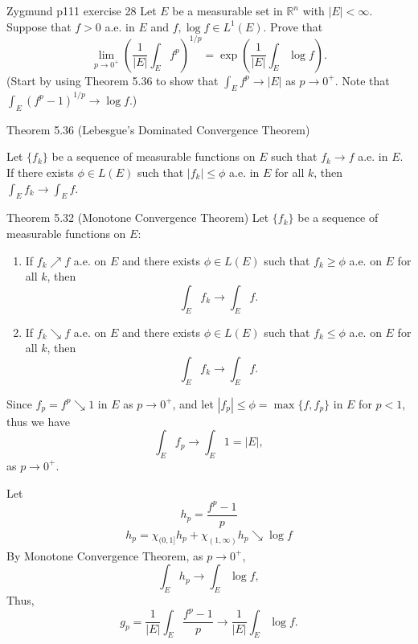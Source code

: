 \documentclass[UTF8,a4paper,10pt]{article}
\begin{document}
\begin{Problem}[]{Zygmund p111 exercise 28}
  Let $E$ be a measurable set in $\mathbb{R}^n$ with $|E| < \infty$. Suppose that $f > 0$ a.e. in $E$ and $f, \log f \in L^1(E)$. Prove that
\[
\lim_{{p \to 0^+}} \left( \frac{1}{|E|} \int_E f^p  \right)^{1/p} = \exp\left(\frac{1}{|E|} \int_E \log f \right).
\]
(Start by using Theorem 5.36 to show that $\int_E f^p  \to |E|$ as $p \to 0^+$. Note that $\int_E (f^p - 1)^{1/p}  \to \log f$.)

\end{Problem}


\begin{mybox}{Theorem 5.36 (Lebesgue's Dominated Convergence Theorem)}

  Let $\{f_k\}$ be a sequence of measurable functions on $E$ such that $f_k \to f$ a.e. in $E$. If there exists $\phi \in L(E)$ such that $|f_k| \leq \phi$ a.e. in $E$ for all $k$, then $\int_E f_k  \to \int_E f $.

\end{mybox}

\begin{mybox}{Theorem 5.32 (Monotone Convergence Theorem)}
   Let $\{f_k\}$ be a sequence of measurable functions on $E$:
  \begin{enumerate}
      \item If $f_k \nearrow f$ a.e. on $E$ and there exists $\phi \in L(E)$ such that $f_k \geq \phi$ a.e. on $E$ for all $k$, then 
      \[
          \int_E f_k  \to \int_E f .
      \]
      \item If $f_k \searrow f$ a.e. on $E$ and there exists $\phi \in L(E)$ such that $f_k \leq \phi$ a.e. on $E$ for all $k$, then 
      \[
          \int_E f_k  \to \int_E f .
      \]
  \end{enumerate}
\end{mybox}


Since \(f_p = f^p \searrow 1 \) in \(E\) as \( p \to 0^+ \), and let \(|f_p|\leq \phi = \max\{f, f_p\}\) in \(E\) for \(p<1\), thus we have
$$\int_E f_p  \to \int_E 1 = |E|, $$ 
as $p \to 0^+$.

Let
\[h_p = \frac{f^p-1}{p}
\]
\begin{align*}
  h_p = \chi_{(0,1]}h_p + \chi_{(1,\infty)}h_p \searrow \log f
\end{align*}
By Monotone Convergence Theorem, as $p \to 0^+$,
\[\int_E h_p  \to \int_E \log f,\]
Thus,\[g_p = \dfrac{1}{|E|}\int_E \frac{f^p-1}{p}  \to \dfrac{1}{|E|}\int_E \log f.\]
\end{document}
